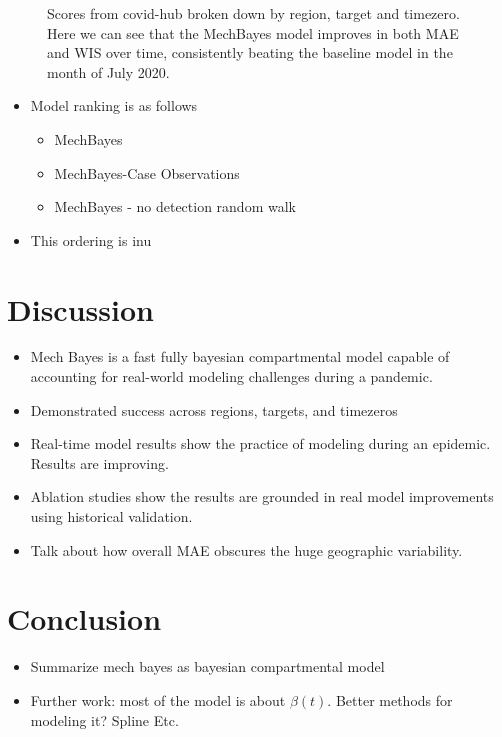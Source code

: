 \documentclass[11pt]{amsart}
\begin{document}
\begin{figure}
\caption{Scores from covid-hub broken down by region, target and timezero. Here we can see that the MechBayes model improves in both MAE and WIS over time, consistently beating the baseline model in the month of July 2020.  }
\label{fig:covidhub}
\end{figure}


   \begin{itemize}
   \item Model ranking is as follows
   \begin{itemize}
   \item MechBayes
   \item MechBayes-Case Observations
   \item MechBayes - no detection random walk
   \end{itemize}
   \item This ordering is inu
   \end{itemize}


\section{Discussion}
\begin{itemize}
\item Mech Bayes is a fast fully bayesian compartmental model capable of accounting for real-world modeling challenges during a pandemic.
\item Demonstrated success across regions, targets, and timezeros
\item Real-time model results show the practice of modeling during an epidemic. Results are improving.
\item Ablation studies show the results are grounded in real model improvements using historical validation.
\item Talk about how overall MAE obscures the huge geographic variability. 
\end{itemize}

\section{Conclusion}

\begin{itemize}
\item Summarize mech bayes as bayesian compartmental model
\item Further work: most of the model is about $\beta(t)$. Better methods for modeling it? Spline Etc.
\end{itemize}





\end{document}
